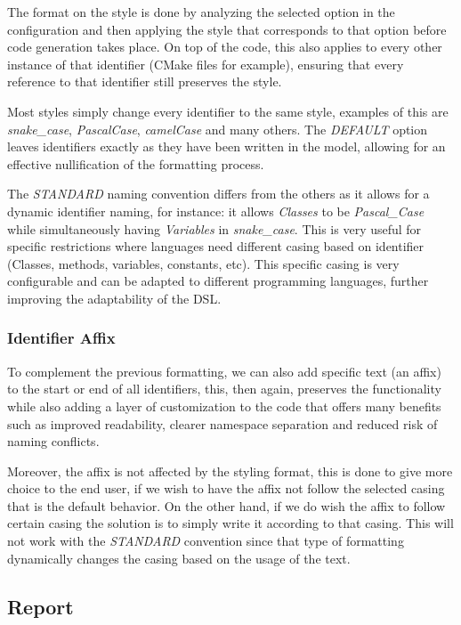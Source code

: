 The format on the style is done by analyzing the selected option in the configuration and then applying the style that corresponds to that option before code generation takes place. On top of the code, this also applies to every other instance of that identifier (CMake files for example), ensuring that every reference to that \gls{identifier} still preserves the style.

Most styles simply change every \gls{identifier} to the same style, examples of this are \textit{snake\_case}, \textit{PascalCase}, \textit{camelCase} and many others. The \textit{DEFAULT} option leaves identifiers exactly as they have been written in the model, allowing for an effective nullification of the formatting process.

The \textit{STANDARD} naming convention differs from the others as it allows for a dynamic \gls{identifier} naming, for instance: it allows \textit{Classes} to be \textit{Pascal\_Case} while simultaneously having \textit{Variables} in \textit{snake\_case}. This is very useful for specific restrictions where languages need different casing based on \gls{identifier} (Classes, methods, variables, constants, etc). This specific casing is very configurable and can be adapted to different programming languages, further improving the adaptability of the \gls{DSL}.


\subsubsection{Identifier Affix}
\label{sec:dsl_name_affix}

To complement the previous formatting, we can also add specific text (an affix) to the start or end of all \glspl{identifier}, this, then again, preserves the functionality while also adding a layer of customization to the code that offers many benefits such as improved readability, clearer namespace separation and reduced risk of naming conflicts.

Moreover, the affix is not affected by the styling format, this is done to give more choice to the end user, if we wish to have the affix not follow the selected casing that is the default behavior. On the other hand, if we do wish the affix to follow certain casing the solution is to simply write it according to that casing. This will not work with the \textit{STANDARD} convention since that type of formatting dynamically changes the casing based on the usage of the text.


\subsection{Report}
\label{sec:dsl_report}

